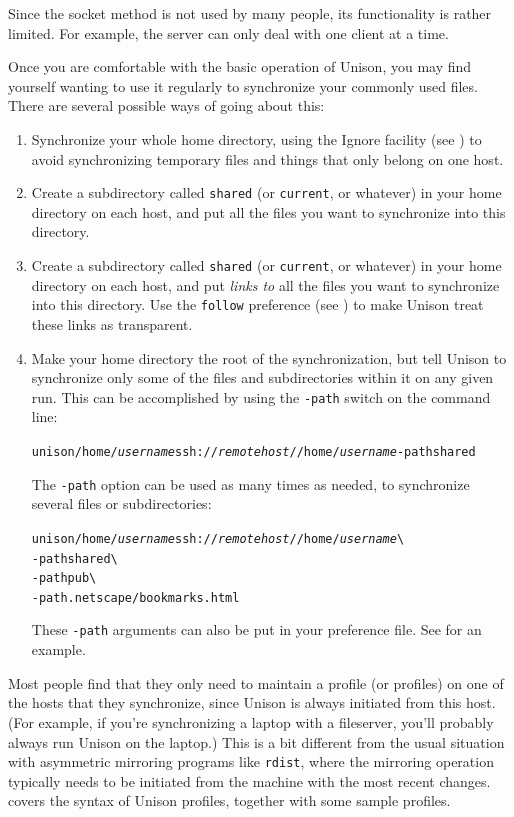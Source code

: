 \documentclass{article}
\newcommand{\NT}[1]{\textit{#1}}
\begin{document}
Since the socket method is not used by many people, its functionality is
rather limited.  For example, the server can only deal with one client at a
time.



Once you are comfortable with the basic operation of Unison, you may
find yourself wanting to use it regularly to synchronize your commonly
used files.  There are several possible ways of going about this:

\begin{enumerate}
\item Synchronize your whole home directory, using the Ignore facility
(see )
to avoid synchronizing temporary files and things that only belong on
one host.
\item Create a subdirectory called {\tt shared} (or {\tt current}, or
whatever) in your home directory on each host, and put all the files
you want to synchronize into this directory.
\item Create a subdirectory called {\tt shared} (or {\tt current}, or
whatever) in your home directory on each host, and put {\em links to}
all the files you want to synchronize into this directory.  Use the
{\tt follow} preference (see ) to make
Unison treat these links as transparent.
\item Make your home directory the root of the synchronization, but
tell Unison to synchronize only some of the files and subdirectories
within it on any given run.  This can be accomplished by using the {\tt -path} switch
on the command line:
\begin{alltt}
       unison /home/\NT{username} ssh://\NT{remotehost}//home/\NT{username} -path shared
\end{alltt}
The {\tt -path} option can be used as many times as needed, to
synchronize several files or subdirectories:
\begin{alltt}
       unison /home/\NT{username} ssh://\NT{remotehost}//home/\NT{username} \verb|\|
          -path shared \verb|\|
          -path pub \verb|\|
          -path .netscape/bookmarks.html
\end{alltt}
These \verb|-path| arguments can also be put in your preference file.
See  for an example.
\end{enumerate}

Most people find that they only need to maintain a profile (or
profiles) on one of the hosts that they synchronize, since Unison is
always initiated from this host.  (For example, if you're
synchronizing a laptop with a fileserver, you'll probably always run
Unison on the laptop.)  This is a bit different from the usual
situation with asymmetric mirroring programs like \verb|rdist|, where
the mirroring operation typically needs to be initiated from the
machine with the most recent changes.  
covers the syntax of Unison profiles, together with some sample profiles.
\end{document}
